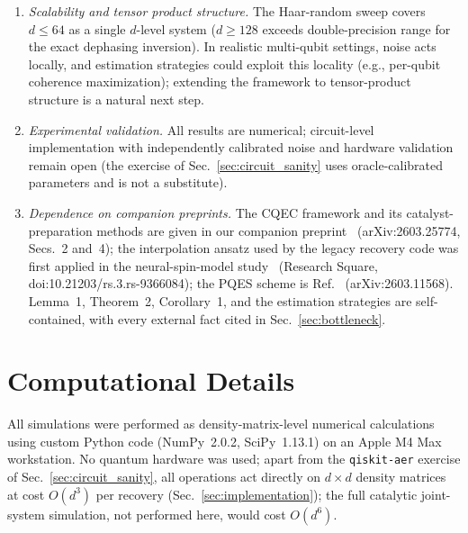 \documentclass[pra,twocolumn,superscriptaddress,longbibliography,floatfix,nofootinbib]{revtex4-2}
\begin{document}
\begin{enumerate}
\item \emph{Scalability and tensor product structure.}
The Haar-random sweep covers $d \leq 64$ as a single $d$-level system ($d \geq 128$ exceeds double-precision range for the exact dephasing inversion).
In realistic multi-qubit settings, noise acts locally, and estimation strategies could exploit this locality (e.g., per-qubit coherence maximization); extending the framework to tensor-product structure is a natural next step.
\item \emph{Experimental validation.}
All results are numerical; circuit-level implementation with independently calibrated noise and hardware validation remain open (the exercise of Sec.~\ref{sec:circuit_sanity} uses oracle-calibrated parameters and is not a substitute).
\item \emph{Dependence on companion preprints.}
The CQEC framework and its catalyst-preparation methods are given in our companion preprint~\cite{Wakaura2026unified} (arXiv:2603.25774, Secs.~2 and~4); the interpolation ansatz used by the legacy recovery code was first applied in the neural-spin-model study~\cite{Wakaura2026catalyst} (Research Square, doi:10.21203/rs.3.rs-9366084); the PQES scheme is Ref.~\cite{Raghoonanan2026} (arXiv:2603.11568).
Lemma~1, Theorem~2, Corollary~1, and the estimation strategies are self-contained, with every external fact cited in Sec.~\ref{sec:bottleneck}.
\end{enumerate}


\section{Computational Details}
\label{sec:computational}

All simulations were performed as density-matrix-level numerical calculations using custom Python code (NumPy~2.0.2, SciPy~1.13.1) on an Apple M4 Max workstation.
No quantum hardware was used; apart from the \texttt{qiskit-aer} exercise of Sec.~\ref{sec:circuit_sanity}, all operations act directly on $d \times d$ density matrices at cost $O(d^3)$ per recovery (Sec.~\ref{sec:implementation}); the full catalytic joint-system simulation, not performed here, would cost $O(d^6)$.
\end{document}
